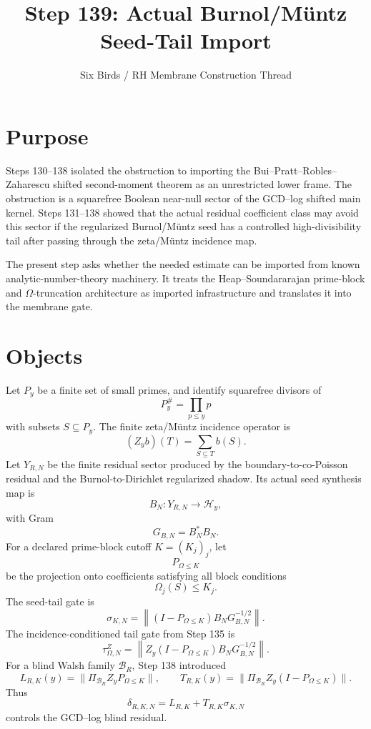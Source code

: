 \documentclass[11pt]{article}
\title{Step 139: Actual Burnol/M\"untz Seed-Tail Import}
\author{Six Birds / RH Membrane Construction Thread}
\date{}
\begin{document}
\maketitle

\section{Purpose}
Steps 130--138 isolated the obstruction to importing the Bui--Pratt--Robles--Zaharescu shifted second-moment theorem as an unrestricted lower frame.  The obstruction is a squarefree Boolean near-null sector of the GCD--log shifted main kernel.  Steps 131--138 showed that the actual residual coefficient class may avoid this sector if the regularized Burnol/M\"untz seed has a controlled high-divisibility tail after passing through the zeta/M\"untz incidence map.

The present step asks whether the needed estimate can be imported from known analytic-number-theory machinery.  It treats the Heap--Soundararajan prime-block and \(\Omega\)-truncation architecture as imported infrastructure and translates it into the membrane gate.

\section{Objects}
Let \(P_y\) be a finite set of small primes, and identify squarefree divisors of
\[
P_y^\#=\prod_{p\le y}p
\]
with subsets \(S\subseteq P_y\).  The finite zeta/M\"untz incidence operator is
\[
  (Z_y b)(T)=\sum_{S\subseteq T}b(S).
\]
Let \(Y_{R,N}\) be the finite residual sector produced by the boundary-to-co-Poisson residual and the Burnol-to-Dirichlet regularized shadow.  Its actual seed synthesis map is
\[
  B_N:Y_{R,N}\longrightarrow \mathcal H_y,
\]
with Gram
\[
  G_{B,N}=B_N^*B_N.
\]
For a declared prime-block cutoff \(K=(K_j)_j\), let
\[
  P_{\Omega\le K}
\]
be the projection onto coefficients satisfying all block conditions
\[
  \Omega_j(S)\le K_j.
\]
The seed-tail gate is
\[
  \sigma_{K,N}
  =
  \left\|
  (I-P_{\Omega\le K})B_NG_{B,N}^{-1/2}
  \right\|.
\]
The incidence-conditioned tail gate from Step 135 is
\[
  \tau_{\Omega,N}^{Z}
  =
  \left\|
  Z_y(I-P_{\Omega\le K})B_NG_{B,N}^{-1/2}
  \right\|.
\]
For a blind Walsh family \(\mathcal B_R\), Step 138 introduced
\[
L_{R,K}(y)=\|\Pi_{\mathcal B_R}Z_yP_{\Omega\le K}\|,
\qquad
T_{R,K}(y)=\|\Pi_{\mathcal B_R}Z_y(I-P_{\Omega\le K})\|.
\]
Thus
\[
\delta_{R,K,N}=L_{R,K}+T_{R,K}\sigma_{K,N}
\]
controls the GCD--log blind residual.
\end{document}
